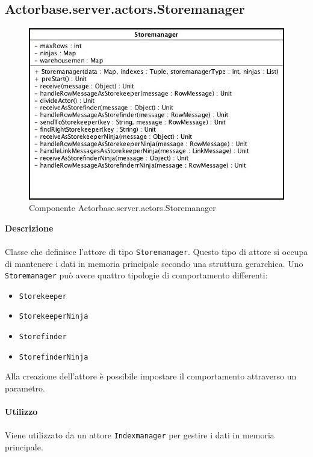 \documentclass[a4paper]{article}
\begin{document}
	\subsection{Actorbase.server.actors.Storemanager}
		\begin{figure}[H]
			\centering
			\includegraphics[width=\textwidth]{Server/storemanager.jpg}
			\caption{Componente Actorbase.server.actors.Storemanager}
		\end{figure}
		\textbf{Descrizione}
			\\ \\
			Classe che definisce l'attore di tipo \texttt{Storemanager}. Questo tipo di attore si occupa di mantenere i dati in memoria principale secondo una struttura gerarchica. Uno \texttt{Storemanager} può avere quattro tipologie di comportamento differenti:
			\begin{itemize}
				\item \texttt{Storekeeper}
				\item \texttt{StorekeeperNinja}
				\item \texttt{Storefinder}
				\item \texttt{StorefinderNinja}
			\end{itemize}
		Alla creazione dell'attore è possibile impostare il comportamento attraverso un parametro. 
			\\ \\
		\textbf{Utilizzo}
			\\ \\
			Viene utilizzato da un attore \texttt{Indexmanager} per gestire i dati in memoria principale.
			\\ \\
\end{document}
